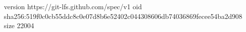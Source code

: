 version https://git-lfs.github.com/spec/v1
oid sha256:519f0c0cb55ddc8c0e07d8b6e52402c044308606db74036869fecee54ba2d908
size 22004
